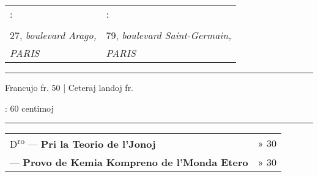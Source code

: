 {\centering
\begin{tabu} to \textwidth{YY}
\footnotesize{} : & \footnotesize{} : \\
 &  \\
\footnotesize 27, {\it boulevard Arago,} & \footnotesize 79, {\it boulevard Saint-Germain,} \\
\footnotesize\it PARIS & \footnotesize\it PARIS
\end{tabu}

\rule{13mm}{0.4pt}

{\footnotesize{}\par}

Francujo  fr. 50 | Ceteraj landoj  fr.

\footnotesize{} : 60 centimoj\par

\rule{\textwidth}{0.4pt}
}
\begin{tabu} to 
\footnotesize D\textsuperscript{ro}  — {\bf Pri la Teorio de l’Jonoj} \dotfill & \footnotesize » 30\\
\footnotesize {} — {\bf Provo de Kemia Kompreno de l’Monda Etero} \dotfill & \footnotesize » 30
\end{tabu}

